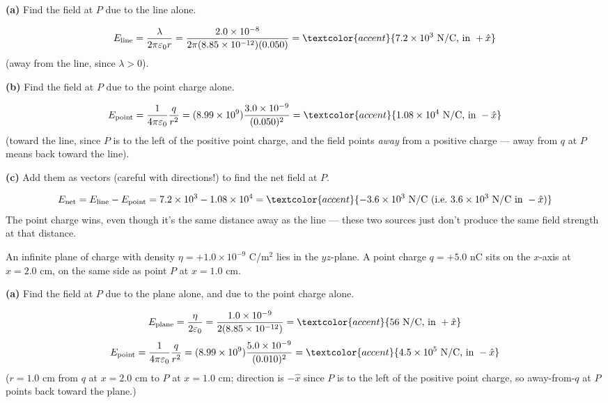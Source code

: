 \documentclass[12pt]{article}
\newcommand{\ANS}[1]{\textcolor{accent}{#1}}
\begin{document}
\begin{center}
\end{center}

\textbf{(a)} Find the field at $P$ due to the line alone.

\[
E_{\text{line}}=\frac{\lambda}{2\pi\varepsilon_0 r}=\frac{2.0\times10^{-8}}
{2\pi(8.85\times10^{-12})(0.050)} = \ANS{7.2\times10^{3}\text{ N/C, in } +\hat x}
\]
(away from the line, since $\lambda>0$).

\textbf{(b)} Find the field at $P$ due to the point charge alone.

\[
E_{\text{point}}=\frac{1}{4\pi\varepsilon_0}\frac{q}{r^2}=(8.99\times10^9)
\frac{3.0\times10^{-9}}{(0.050)^2} = \ANS{1.08\times10^{4}\text{ N/C, in } -\hat x}
\]
(toward the line, since $P$ is to the left of the positive point charge, and the
field points \emph{away} from a positive charge --- away from $q$ at $P$ means
back toward the line).

\textbf{(c)} Add them as vectors (careful with directions!) to find the net field at
$P$.

\[
E_{\text{net}} = E_{\text{line}}-E_{\text{point}} = 7.2\times10^{3}-1.08\times10^{4}
= \ANS{-3.6\times10^{3}\text{ N/C (i.e.\ } 3.6\times10^3 \text{ N/C in } -\hat x\text{)}}
\]
The point charge wins, even though it's the same distance away as the line ---
these two sources just don't produce the same field strength at that distance.

\prob An infinite plane of charge with density $\eta=+1.0\times10^{-9}$ C/m$^2$ lies
in the $yz$-plane. A point charge $q=+5.0$ nC sits on the $x$-axis at $x=2.0$ cm, on
the same side as point $P$ at $x=1.0$ cm.

\textbf{(a)} Find the field at $P$ due to the plane alone, and due to the point
charge alone.

\[
E_{\text{plane}}=\frac{\eta}{2\varepsilon_0}=\frac{1.0\times10^{-9}}
{2(8.85\times10^{-12})} = \ANS{56\text{ N/C, in }+\hat x}
\]
\[
E_{\text{point}}=\frac{1}{4\pi\varepsilon_0}\frac{q}{r^2}=(8.99\times10^9)
\frac{5.0\times10^{-9}}{(0.010)^2} = \ANS{4.5\times10^{5}\text{ N/C, in }-\hat x}
\]
($r=1.0$ cm from $q$ at $x=2.0$ cm to $P$ at $x=1.0$ cm; direction is $-\hat x$
since $P$ is to the left of the positive point charge, so away-from-$q$ at $P$
points back toward the plane.)
\end{document}
